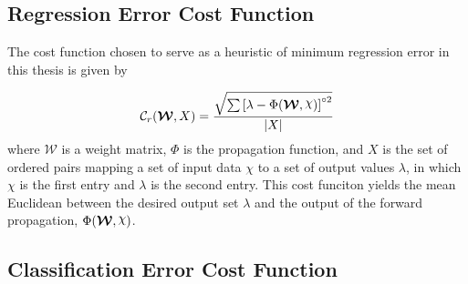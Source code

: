\documentclass[11pt]{afthesis}
\DeclarePairedDelimiter\ket{\lvert}{\rangle}
\DeclareRobustCommand{\rchi}{{\mathpalette\irchi\relax}}
\newcommand{\irchi}[2]{\raisebox{\depth}{$#1\chi$}}
\begin{document}
	\subsection{Regression Error Cost Function}
	
	\label{scn:cost_functions_reg}
	The cost function chosen to serve as a heuristic of minimum regression error in this thesis is given by
		
	\begin{equation} \label{eq:cost_function_reg}
	\mathcal{C}_r(\boldsymbol{\mathcal{W}},X) = \frac{\sqrt{\sum \left[\lambda - \Phi(\boldsymbol{\mathcal{W}},\rchi) \right]^{\circ 2}}}{|X|}
	\end{equation}
	\label{scn:cost_function_regression}
	\noindent where $\boldsymbol{\mathcal{W}}$ is a weight matrix, $\Phi$ is the propagation function, and $X$ is the set of ordered pairs mapping a set of input data $\chi$ to a set of output values $\lambda$, in which $\chi$ is the first entry and $\lambda$ is the second entry. This cost funciton yields the mean Euclidean between the desired output set $\lambda$ and the output of the forward propagation, $\Phi(\boldsymbol{\mathcal{W}},\rchi)$.
	
	\subsection{Classification Error Cost Function}
	\label{scn:cost_function_class}
	
	
		
\end{document}
